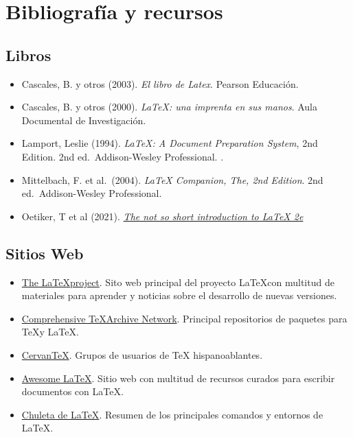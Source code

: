 \documentclass[
  letterpaper,
  DIV=11,
  numbers=noendperiod]{scrreport}
\providecommand{\tightlist}{%
  \setlength{\itemsep}{0pt}\setlength{\parskip}{0pt}}\usepackage{longtable,booktabs,array}
\begin{document}

\hypertarget{bibliografuxeda-y-recursos}{%
\chapter*{Bibliografía y recursos}\label{bibliografuxeda-y-recursos}}

\hypertarget{libros}{%
\section*{Libros}\label{libros}}

\begin{itemize}
\tightlist
\item
  Cascales, B. y otros (2003). \emph{El libro de Latex}. Pearson
  Educación.
\item
  Cascales, B. y otros (2000). \emph{LaTeX: una imprenta en sus manos}.
  Aula Documental de Investigación.
\item
  Lamport, Leslie (1994). \emph{LaTeX: A Document Preparation System},
  2nd Edition. 2nd ed.~Addison-Wesley Professional. .
\item
  Mittelbach, F. et al.~(2004). \emph{LaTeX Companion, The, 2nd
  Edition}. 2nd ed.~Addison-Wesley Professional.
\item
  Oetiker, T et al (2021).
  \href{https://tobi.oetiker.ch/lshort/lshort.pdf}{\emph{The not so
  short introduction to LaTeX 2e}}
\end{itemize}

\hypertarget{sitios-web}{%
\section*{Sitios Web}\label{sitios-web}}

\begin{itemize}
\tightlist
\item
  \href{https://www.latex-project.org/}{The \LaTeX project}. Sito
  web principal del proyecto \LaTeX con multitud de materiales para
  aprender y noticias sobre el desarrollo de nuevas versiones.
\item
  \href{https://ctan.org/}{Comprehensive \TeX Archive Network}.
  Principal repositorios de paquetes para \TeX y \LaTeX.
\item
  \href{www.cervantex.es/}{CervanTeX}. Grupos de usuarios de TeX
  hispanoablantes.
\item
  \href{https://project-awesome.org/egeerardyn/awesome-LaTeX}{Awesome
  LaTeX}. Sitio web con multitud de recursos curados para escribir
  documentos con \LaTeX.
\item
  \href{chulatex.pdf}{Chuleta de \LaTeX}. Resumen de los principales
  comandos y entornos de \LaTeX.
\end{itemize}
\end{document}
